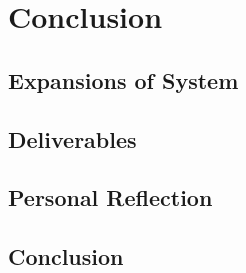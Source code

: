 \chapter{Conclusion}%
\label{conclusion}

\section{Expansions of System}

\section{Deliverables}

\section{Personal Reflection}

\section{Conclusion}

